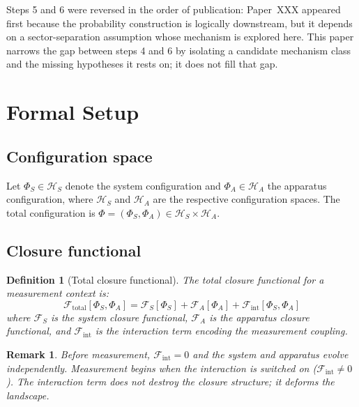 \documentclass[12pt]{article}
\newtheorem{definition}[theorem]{Definition}
\newtheorem{remark}[theorem]{Remark}
\newcommand{\Fcal}{\mathcal{F}}
\begin{document}
Steps 5 and 6 were reversed in the order of publication: Paper~XXX appeared first because the probability construction is logically downstream, but it depends on a sector-separation assumption whose mechanism is explored here. This paper narrows the gap between steps 4 and 6 by isolating a candidate mechanism class and the missing hypotheses it rests on; it does not fill that gap.

\section{Formal Setup}\label{sec:setup}

\subsection{Configuration space}

Let $\Phi_S \in \mathcal{H}_S$ denote the system configuration and $\Phi_A \in \mathcal{H}_A$ the apparatus configuration, where $\mathcal{H}_S$ and $\mathcal{H}_A$ are the respective configuration spaces. The total configuration is $\Phi = (\Phi_S, \Phi_A) \in \mathcal{H}_S \times \mathcal{H}_A$.

\subsection{Closure functional}

\begin{definition}[Total closure functional]\label{def:total}
The total closure functional for a measurement context is:
\begin{equation}\label{eq:total}
    \Fcal_{\mathrm{total}}[\Phi_S, \Phi_A] = \Fcal_S[\Phi_S] + \Fcal_A[\Phi_A] + \Fcal_{\mathrm{int}}[\Phi_S, \Phi_A]
\end{equation}
where $\Fcal_S$ is the system closure functional, $\Fcal_A$ is the apparatus closure functional, and $\Fcal_{\mathrm{int}}$ is the interaction term encoding the measurement coupling.
\end{definition}

\begin{remark}
Before measurement, $\Fcal_{\mathrm{int}} = 0$ and the system and apparatus evolve independently. Measurement begins when the interaction is switched on ($\Fcal_{\mathrm{int}} \neq 0$). The interaction term does not destroy the closure structure; it deforms the landscape.
\end{remark}
\end{document}
